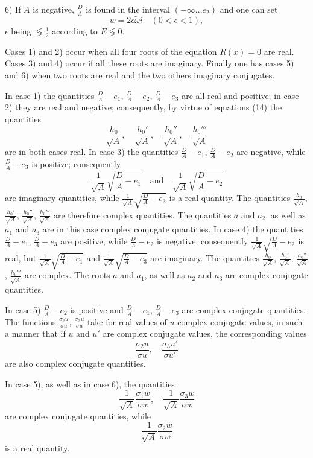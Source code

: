 \documentclass{article}
\begin{document}
6) If $A$ is negative, $\frac{D}{A}$ is found in the interval $(-\infty \ldots e_2)$ and one can set
\[
w = 2\epsilon\tilde{\omega}i \quad (0 < \epsilon < 1),
\]
$\epsilon$ being $\lessgtr \frac{1}{2}$ according to $E \lessgtr 0$.

Cases 1) and 2) occur when all four roots of the equation $R(x) = 0$ are real.
Cases 3) and 4) occur if all these roots are imaginary.
Finally one has cases 5) and 6) when two roots are real and the two others imaginary conjugates.

In case 1) the quantities $\frac{D}{A} - e_1$, $\frac{D}{A} - e_2$, $\frac{D}{A} - e_3$ are all real and positive; in case 2) they are real and negative; consequently, by virtue of equations (14) the quantities
\[
\frac{h_0}{\sqrt{A}}, \quad \frac{h_0'}{\sqrt{A}}, \quad \frac{h_0''}{\sqrt{A}}, \quad \frac{h_0'''}{\sqrt{A}}
\]
are in both cases real.
In case 3) the quantities $\frac{D}{A} - e_1$, $\frac{D}{A} - e_2$ are negative, while $\frac{D}{A} - e_3$ is positive; consequently
\[
\frac{1}{\sqrt{A}}\sqrt{\frac{D}{A} - e_1} \quad \text{and} \quad \frac{1}{\sqrt{A}}\sqrt{\frac{D}{A} - e_2}
\]
are imaginary quantities, while $\frac{1}{\sqrt{A}}\sqrt{\frac{D}{A} - e_3}$ is a real quantity.
The quantities $\frac{h_0}{\sqrt{A}}$, $\frac{h_0'}{\sqrt{A}}$, $\frac{h_0''}{\sqrt{A}}$, $\frac{h_0'''}{\sqrt{A}}$ are therefore complex quantities. The quantities $a$ and $a_2$, as well as $a_1$ and $a_3$ are in this case complex conjugate quantities.
In case 4) the quantities $\frac{D}{A} - e_1$, $\frac{D}{A} - e_3$ are positive, while $\frac{D}{A} - e_2$ is negative; consequently
$\frac{1}{\sqrt{A}}\sqrt{\frac{D}{A} - e_2}$ is real, but $\frac{1}{\sqrt{A}}\sqrt{\frac{D}{A} - e_1}$ and $\frac{1}{\sqrt{A}}\sqrt{\frac{D}{A} - e_3}$ are imaginary.
The quantities $\frac{h_0}{\sqrt{A}}$, $\frac{h_0'}{\sqrt{A}}$, $\frac{h_0''}{\sqrt{A}}$, $\frac{h_0'''}{\sqrt{A}}$ are complex.
The roots $a$ and $a_1$, as well as $a_2$ and $a_3$ are complex conjugate quantities.

In case 5) $\frac{D}{A} - e_2$ is positive and $\frac{D}{A} - e_1$, $\frac{D}{A} - e_3$ are complex conjugate quantities. The functions $\frac{\sigma_2u}{\sigma u}$, $\frac{\sigma_3u}{\sigma u}$ take for real values of $u$ complex conjugate values, in such a manner that if $u$ and $u'$ are complex conjugate values, the corresponding values
\[
\frac{\sigma_2u}{\sigma u}, \quad \frac{\sigma_3u'}{\sigma u'}
\]
are also complex conjugate quantities.

In case 5), as well as in case 6), the quantities
\[
\frac{1}{\sqrt{A}}\frac{\sigma_1w}{\sigma w}, \quad \frac{1}{\sqrt{A}}\frac{\sigma_3w}{\sigma w}
\]
are complex conjugate quantities, while
\[
\frac{1}{\sqrt{A}}\frac{\sigma_2w}{\sigma w}
\]
is a real quantity.
\end{document}
